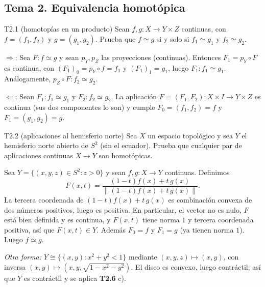 \subsection{Tema 2. Equivalencia homotópica}

\begin{ejercicio}{T2.1 (homotopías en un producto)}
Sean $f, g \colon X \to Y \times Z$ continuas, con $f = (f_1,f_2)$ y $g = (g_1,g_2)$. Prueba que $f \simeq g$ si y solo si $f_1 \simeq g_1$ y $f_2 \simeq g_2$.

\sol \fuentepropia

$\Rightarrow$: Sea $F \colon f \simeq g$ y sean $p_Y, p_Z$ las proyecciones (continuas). Entonces $F_1 = p_Y \circ F$ es continua, con $(F_1)_0 = p_Y \circ f = f_1$ y $(F_1)_1 = g_1$, luego $F_1 \colon f_1 \simeq g_1$. Análogamente, $p_Z \circ F \colon f_2 \simeq g_2$.

$\Leftarrow$: Sean $F_1 \colon f_1 \simeq g_1$ y $F_2 \colon f_2 \simeq g_2$. La aplicación $F = (F_1,F_2) \colon X \times I \to Y \times Z$ es continua (sus dos componentes lo son) y cumple $F_0 = (f_1,f_2) = f$ y $F_1 = (g_1,g_2) = g$.
\end{ejercicio}

\begin{ejercicio}{T2.2 (aplicaciones al hemisferio norte)}
Sea $X$ un espacio topológico y sea $Y$ el hemisferio norte abierto de $S^2$ (sin el ecuador). Prueba que cualquier par de aplicaciones continuas $X \to Y$ son homotópicas.

\sol \fuentepropia

Sea $Y = \{(x,y,z) \in S^2 : z > 0\}$ y sean $f,g \colon X \to Y$ continuas. Definimos
\[ F(x,t) = \frac{(1-t)f(x) + t\,g(x)}{\|(1-t)f(x) + t\,g(x)\|}. \]
La tercera coordenada de $(1-t)f(x) + t\,g(x)$ es combinación convexa de dos números positivos, luego es positiva. En particular, el vector no es nulo, $F$ está bien definida y es continua, y $F(x,t)$ tiene norma $1$ y tercera coordenada positiva, así que $F(x,t) \in Y$. Además $F_0 = f$ y $F_1 = g$ (ya tienen norma $1$). Luego $f \simeq g$.

\emph{Otra forma:} $Y \cong \{(x,y) : x^2 + y^2 < 1\}$ mediante $(x,y,z) \mapsto (x,y)$, con inversa $(x,y) \mapsto (x,y,\sqrt{1-x^2-y^2})$. El disco es convexo, luego contráctil; así que $Y$ es contráctil y se aplica \textbf{T2.6} c).
\end{ejercicio}

